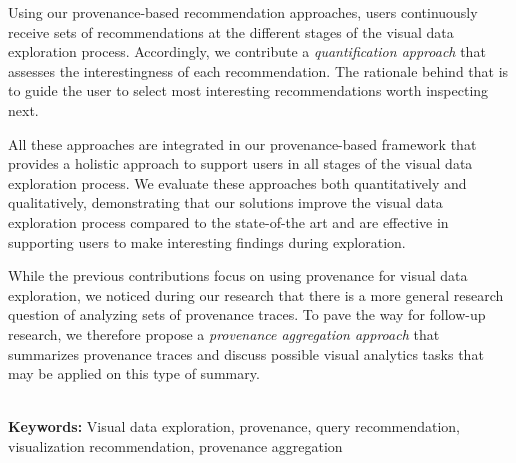Using our provenance-based recommendation approaches, users continuously receive sets of recommendations at the different stages of the visual data exploration process. Accordingly, we contribute a \emph{quantification approach} that assesses the interestingness of each recommendation. The rationale behind that is to guide the user to select most interesting recommendations worth inspecting next. 

All these approaches are integrated in our provenance-based framework that provides a holistic approach to support users in all stages of the visual data exploration process. We evaluate these approaches both quantitatively and qualitatively, demonstrating that our solutions improve the visual data exploration process compared to the state-of-the art and are effective in supporting users to make interesting findings during exploration. 


While the previous contributions focus on using provenance for visual data exploration, we noticed during our research that there is a more general research question of analyzing sets of provenance traces. 
To pave the way for follow-up research, we therefore propose a \emph{provenance aggregation approach} that summarizes provenance traces and discuss possible visual analytics tasks that may be applied on this type of summary.


~~\\
\textbf{Keywords: }Visual data exploration, provenance, query recommendation, visualization recommendation, provenance aggregation



